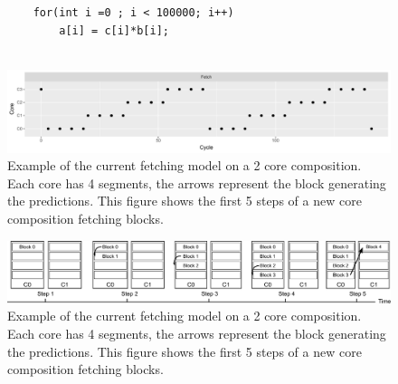 

\begin{figure}[t]
\lstset{language=C,numbersep=4pt}
\begin{center}
\begin{lstlisting}
	for(int i =0 ; i < 100000; i++)
		a[i] = c[i]*b[i];
	
\end{lstlisting}
\end{center}
\vspace{-1em}
\label{lst:basic}
\end{figure}

\begin{figure}[t]
    \centering
    \includegraphics[width=1\textwidth]{chapter3/graphics/4fetchnorm.pdf}
    \caption{Example of the current fetching model on a 2 core composition. Each core has 4 segments, the arrows represent the block generating the predictions. This figure shows the first 5 steps of a new core composition fetching blocks.}
    \label{fig:fetch_norm}
\vspace{1em}
\end{figure}

\begin{figure}[t]
    \centering
    \includegraphics[width=1\textwidth]{chapter3/graphics/normfetch.pdf}
    \caption{Example of the current fetching model on a 2 core composition. Each core has 4 segments, the arrows represent the block generating the predictions. This figure shows the first 5 steps of a new core composition fetching blocks.}
    \label{fig:old_fetch}
\vspace{1em}
\end{figure}


